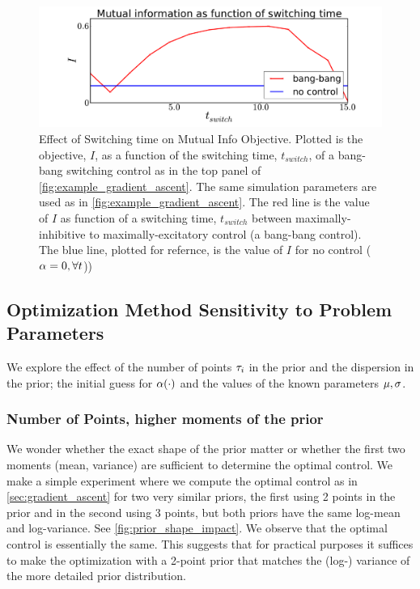 \documentclass{article}
\begin{document}
\begin{figure}[htp]
\begin{center}
  \includegraphics[width=1\textwidth]{Figs/AdjointOptimizer/SweepSwitchpoint_wide.pdf}
  \caption[Effect of Switching time on Mutual Info Objective]{Effect of
  Switching time on Mutual Info Objective. Plotted is the objective, $I$, as a
  function of the switching time, $t_{switch}$, of a bang-bang switching control
  as in the top panel of \cref{fig:example_gradient_ascent}. The same
  simulation parameters are used as in \cref{fig:example_gradient_ascent}. The
  red line is the value of $I$ as function of a switching time, $t_{switch}$
  between maximally-inhibitive to maximally-excitatory control (a bang-bang
  control). The blue line, plotted for refernce, is the value of
  $I$ for no control (${\alpha}=0, \forall t$))}
  \label{fig:sweep_switchtime}
\end{center}
\end{figure}


\subsection{Optimization Method Sensitivity to Problem Parameters}
We explore the effect of the number of points
${\tau}_i$ in the prior and the dispersion in the prior; the initial
guess for ${\alpha}(\cdot)$ and the values of the known parameters ${\mu }, {\sigma }$. 

\subsubsection{Number of Points, higher moments of the prior}
We wonder whether the exact shape of the prior matter or whether the first two
moments (mean, variance) are sufficient to determine the optimal control. We
make a simple experiment where we compute the optimal control as in
\cref{sec:gradient_ascent} for two very similar priors, the first using 2 points
in the prior and in the second using 3 points, but both priors have the same
log-mean and log-variance. See \cref{fig:prior_shape_impact}. We observe that
the optimal control is essentially the same. This suggests that for practical
purposes it suffices to make the optimization with a 2-point prior that matches
the (log-) variance of the more detailed prior distribution.
\end{document}
